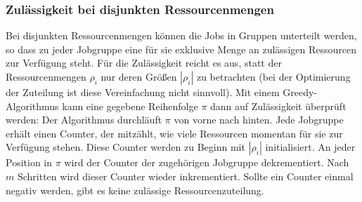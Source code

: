 \documentclass{scrreprt}
\begin{document}
\subsubsection{Zulässigkeit bei disjunkten Ressourcenmengen}
\label{subsubsec:ZulaessigkeitBeiDisjunktenRessourcenmengen}
Bei disjunkten Ressourcenmengen können die Jobs in Gruppen unterteilt werden, 
so dass zu jeder Jobgruppe eine für sie exklusive Menge an zulässigen Ressourcen zur Verfügung steht.
Für die Zulässigkeit reicht es aus, statt der Ressourcenmengen $\rho_i$ nur deren Größen $|\rho_i|$ zu betrachten
(bei der Optimierung der Zuteilung ist diese Vereinfachung nicht sinnvoll).
Mit einem Greedy-Algorithmus kann eine gegebene Reihenfolge $\pi$ dann auf Zulässigkeit überprüft werden:
Der Algorithmus durchläuft $\pi$ von vorne nach hinten.
Jede Jobgruppe erhält einen Counter, der mitzählt, wie viele Ressourcen momentan für sie zur Verfügung stehen.
Diese Counter werden zu Beginn mit $|\rho_i|$ initialisiert.
An jeder Position in $\pi$ wird der Counter der zugehörigen Jobgruppe dekrementiert.
Nach $m$ Schritten wird dieser Counter wieder inkrementiert.
Sollte ein Counter einmal negativ werden, gibt es keine zulässige Ressourcenzuteilung.
\end{document}
